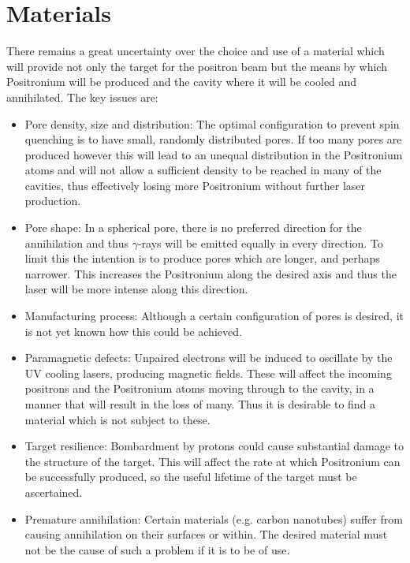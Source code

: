 \section{Materials}
There remains a great uncertainty over the choice and use of a material which will provide not only the target for the positron beam but the means by which Positronium will be produced and the cavity where it will be cooled and annihilated. The key issues are:
\begin{itemize}
	\item   Pore density, size and distribution: The optimal configuration to prevent spin quenching is to have small, randomly distributed pores. If too many pores are produced however this will lead to an unequal distribution in the Positronium atoms and will not allow a sufficient density to be reached in many of the cavities, thus effectively losing more Positronium without further laser production.
	\item Pore shape: In a spherical pore, there is no preferred direction for the annihilation and thus $\gamma$-rays will be emitted equally in every direction. To limit this the intention is to produce pores which are longer, and perhaps narrower. This increases the Positronium along the desired axis and thus the laser will be more intense along this direction.
	\item Manufacturing process: Although a certain configuration of pores is desired, it is not yet known how this could be achieved.
	\item Paramagnetic defects: Unpaired electrons will be induced to oscillate by the UV cooling lasers, producing magnetic fields. These will affect the incoming positrons and the Positronium atoms moving through to the cavity, in a manner that will result in the loss of many. Thus it is desirable to find a material which is not subject to these.
	\item Target resilience: Bombardment by protons could cause substantial damage to the structure of the target. This will affect the rate at which Positronium can be successfully produced, so the useful lifetime of the target must be ascertained.
	\item Premature annihilation: Certain materials (e.g. carbon nanotubes) suffer from causing annihilation on their surfaces or within. The desired material must not be the cause of such a problem if it is to be of use.
\end{itemize}

